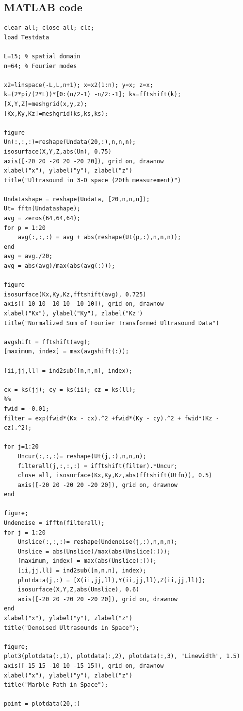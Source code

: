 \documentclass{article}
\begin{document}
\subsection*{MATLAB code}
\begin{lstlisting}[style=Matlab-editor]
clear all; close all; clc;
load Testdata

L=15; % spatial domain
n=64; % Fourier modes

x2=linspace(-L,L,n+1); x=x2(1:n); y=x; z=x;
k=(2*pi/(2*L))*[0:(n/2-1) -n/2:-1]; ks=fftshift(k);
[X,Y,Z]=meshgrid(x,y,z);
[Kx,Ky,Kz]=meshgrid(ks,ks,ks);

figure
Un(:,:,:)=reshape(Undata(20,:),n,n,n);
isosurface(X,Y,Z,abs(Un), 0.75)
axis([-20 20 -20 20 -20 20]), grid on, drawnow
xlabel("x"), ylabel("y"), zlabel("z")
title("Ultrasound in 3-D space (20th measurement)")

Undatashape = reshape(Undata, [20,n,n,n]);
Ut= fftn(Undatashape);
avg = zeros(64,64,64);
for p = 1:20
    avg(:,:,:) = avg + abs(reshape(Ut(p,:),n,n,n));
end
avg = avg./20;
avg = abs(avg)/max(abs(avg(:)));

figure
isosurface(Kx,Ky,Kz,fftshift(avg), 0.725)
axis([-10 10 -10 10 -10 10]), grid on, drawnow
xlabel("Kx"), ylabel("Ky"), zlabel("Kz")
title("Normalized Sum of Fourier Transformed Ultrasound Data")

avgshift = fftshift(avg);
[maximum, index] = max(avgshift(:));

[ii,jj,ll] = ind2sub([n,n,n], index);

cx = ks(jj); cy = ks(ii); cz = ks(ll);
%%
fwid = -0.01;
filter = exp(fwid*(Kx - cx).^2 +fwid*(Ky - cy).^2 + fwid*(Kz - cz).^2);

for j=1:20
    Uncur(:,:,:)= reshape(Ut(j,:),n,n,n);
    filterall(j,:,:,:) = ifftshift(filter).*Uncur;
    close all, isosurface(Kx,Ky,Kz,abs(fftshift(Utfn)), 0.5)
    axis([-20 20 -20 20 -20 20]), grid on, drawnow
end

figure;
Undenoise = ifftn(filterall);
for j = 1:20 
    Unslice(:,:,:)= reshape(Undenoise(j,:),n,n,n);
    Unslice = abs(Unslice)/max(abs(Unslice(:)));
    [maximum, index] = max(abs(Unslice(:)));
    [ii,jj,ll] = ind2sub([n,n,n], index);
    plotdata(j,:) = [X(ii,jj,ll),Y(ii,jj,ll),Z(ii,jj,ll)];
    isosurface(X,Y,Z,abs(Unslice), 0.6)
    axis([-20 20 -20 20 -20 20]), grid on, drawnow
end
xlabel("x"), ylabel("y"), zlabel("z")
title("Denoised Ultrasounds in Space");

figure;
plot3(plotdata(:,1), plotdata(:,2), plotdata(:,3), "Linewidth", 1.5)
axis([-15 15 -10 10 -15 15]), grid on, drawnow
xlabel("x"), ylabel("y"), zlabel("z")
title("Marble Path in Space");

point = plotdata(20,:)
\end{lstlisting}
\end{document}
